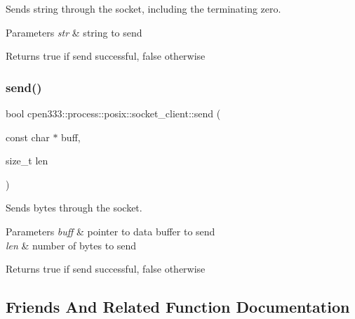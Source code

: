 Sends string through the socket, including the terminating zero. 


\begin{DoxyParams}{Parameters}
{\em str} & string to send \\
\hline
\end{DoxyParams}
\begin{DoxyReturn}{Returns}
true if send successful, false otherwise 
\end{DoxyReturn}
\mbox{\label{classcpen333_1_1process_1_1posix_1_1socket__client_ac6b955fb383562a1f5699ed9a4dc416f}} 
\subsubsection{\texorpdfstring{send()}{send()}\hspace{0.1cm}{\footnotesize\ttfamily [2/2]}}
{\footnotesize\ttfamily bool cpen333\+::process\+::posix\+::socket\+\_\+client\+::send (\begin{DoxyParamCaption}\item[{const char $\ast$}]{buff,  }\item[{size\+\_\+t}]{len }\end{DoxyParamCaption})\hspace{0.3cm}{\ttfamily [inline]}}



Sends bytes through the socket. 


\begin{DoxyParams}{Parameters}
{\em buff} & pointer to data buffer to send \\
\hline
{\em len} & number of bytes to send \\
\hline
\end{DoxyParams}
\begin{DoxyReturn}{Returns}
true if send successful, false otherwise 
\end{DoxyReturn}


\subsection{Friends And Related Function Documentation}
\mbox{\label{classcpen333_1_1process_1_1posix_1_1socket__client_aba37c0ea463da9263b0712d3b3389066}} 

